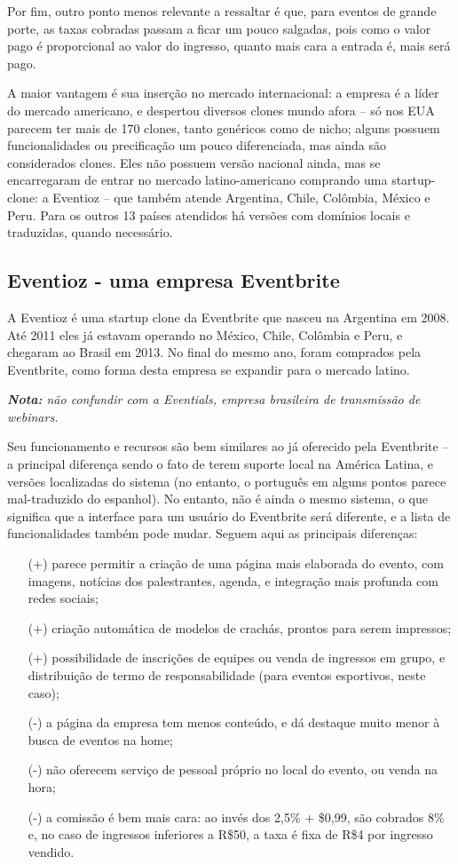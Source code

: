 \documentclass[12pt,a4paper,twoside,hyphens,english,brazil]{abntex2}
\begin{document}
Por fim, outro ponto menos relevante a ressaltar é que, para eventos de grande porte, as taxas cobradas passam a ficar um pouco salgadas, pois como o valor pago é proporcional ao valor do ingresso, quanto mais cara a entrada é, mais será pago.

A maior vantagem é sua inserção no mercado internacional: a empresa é a líder do mercado americano, e despertou diversos clones mundo afora -- só nos EUA parecem ter mais de 170 clones, tanto genéricos como de nicho\cite{eventbrite-concorrencia}; alguns possuem funcionalidades ou precificação um pouco diferenciada\cite{eventbrite-concorrencia-quora}, mas ainda são considerados clones. Eles não possuem versão nacional ainda, mas se encarregaram de entrar no mercado latino-americano comprando uma startup-clone: a Eventioz -- que também atende Argentina, Chile, Colômbia, México e Peru. Para os outros 13 países atendidos há versões com domínios locais e traduzidas, quando necessário.

\subsection{Eventioz - uma empresa Eventbrite}
A Eventioz é uma startup clone da Eventbrite que nasceu na Argentina em 2008. Até 2011 eles já estavam operando no México, Chile, Colômbia e Peru, e chegaram ao Brasil em 2013. No final do mesmo ano, foram comprados pela Eventbrite, como forma desta empresa se expandir para o mercado latino.

\emph{\textbf{Nota:} não confundir com a Eventials, empresa brasileira de transmissão de webinars.}

Seu funcionamento e recursos são bem similares ao já oferecido pela Eventbrite -- a principal diferença sendo o fato de terem suporte local na América Latina, e versões localizadas do sistema (no entanto, o português em alguns pontos parece mal-traduzido do espanhol). No entanto, não é ainda o mesmo sistema, o que significa que a interface para um usuário do Eventbrite será diferente, e a lista de funcionalidades também pode mudar. Seguem aqui as principais diferenças:
\begin{itemize}[itemsep=-0.5ex]
	\item[(+)] parece permitir a criação de uma página mais elaborada do evento, com imagens, notícias dos palestrantes, agenda, e integração mais profunda com redes sociais;
	\item[(+)] criação automática de modelos de crachás, prontos para serem impressos;
	\item[(+)] possibilidade de inscrições de equipes ou venda de ingressos em grupo, e distribuição de termo de responsabilidade (para eventos esportivos, neste caso);
	\item[(-)] a página da empresa tem menos conteúdo, e dá destaque muito menor à busca de eventos na home;
	\item[(-)] não oferecem serviço de pessoal próprio no local do evento, ou venda na hora;
	\item[(-)] a comissão é bem mais cara: ao invés dos 2,5\% + \$0,99, são cobrados 8\% e, no caso de ingressos inferiores a R\$50, a taxa é fixa de R\$4 por ingresso vendido.
\end{itemize}
\end{document}
